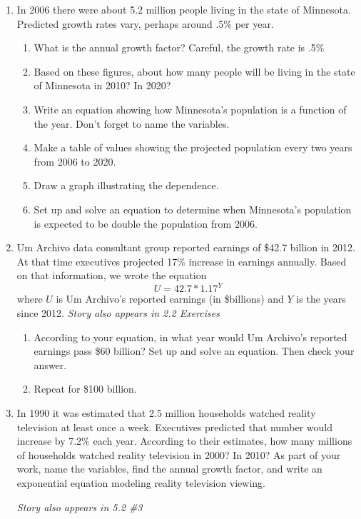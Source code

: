 \begin{enumerate}
\item In 2006 there were about 5.2 million people living in the state of Minnesota.  Predicted growth rates vary, perhaps around .5\% per year. %
\begin{enumerate}
\item What is the annual growth factor?  Careful, the growth rate is .5\%
\item Based on these figures, about how many people will be living in the state of Minnesota in 2010?  In 2020?  
\item Write an equation showing how Minnesota's population is a function of the year.  Don't forget to name the variables.
\item Make a table of values showing the projected population every two years from 2006 to 2020.  
\item Draw a graph illustrating the dependence.
\item Set up and solve an equation to determine when Minnesota's population is expected to be double the population from 2006.
\end{enumerate}

\item Um Archivo data consultant group reported earnings of \$42.7 billion in 2012.  At that time executives projected 17\% increase in earnings annually.  Based on that information, we wrote the equation $$U = 42.7 \ast 1.17^Y$$ where $U$ is Um Archivo's reported earnings (in \$billions) and $Y$ is the years since 2012.
\hfill \emph{Story also appears in 2.2 Exercises}
\begin{enumerate}
\item According to your equation, in what year would Um Archivo's reported earnings pass \$60 billion?  Set up and solve an equation.  Then check your answer.
\item Repeat for \$100 billion.
\end{enumerate}  

\item In 1990 it was estimated that 2.5 million households watched reality television at least once a week.  Executives predicted that number would increase by 7.2\% each year.  According to their estimates, how many millions of households watched reality television in 2000?  In 2010?  As part of your work, name the variables, find the annual growth factor, and write an exponential equation modeling reality television viewing.

\hfill \emph{Story also appears in 5.2 \#3}

\end{enumerate}




